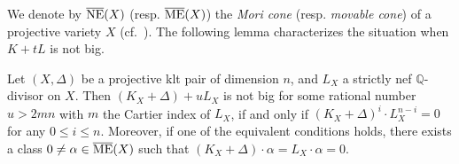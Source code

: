 We denote by $\overline{\textup{NE}}(X)$ (resp. $\overline{\textup{ME}}(X)$) the \textit{Mori cone} (resp. \textit{movable cone}) of a projective variety $X$ (cf.~\cite{BDPP13}).
The following lemma characterizes the situation when $K+tL$ is not big. 
\begin{lemme}\label{lem-not-big-some}
Let $(X,\Delta)$ be a projective klt  pair of dimension $n$, 
and $L_X$  a strictly nef $\mathbb{Q}$-divisor on $X$.	
Then $(K_X+\Delta)+uL_X$ is not big for some rational number $u>2mn$ with $m$  the Cartier index of $L_X$, if and only if
$(K_X+\Delta)^i\cdot L_X^{n-i}=0$ for any $0\leqslant i\leqslant n$. 	
Moreover, if one of the  equivalent conditions holds, there exists a  class $0\neq \alpha\in\overline{\textup{ME}}(X)$ such that 
$(K_X+\Delta)\cdot\alpha=L_X\cdot\alpha=0$. 
\end{lemme}

